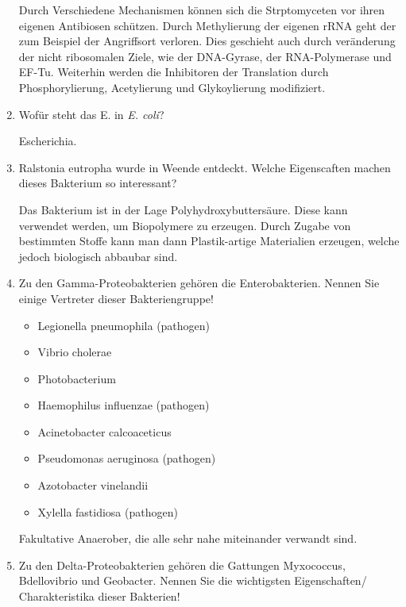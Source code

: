 \begin{enumerate}
		Durch Verschiedene Mechanismen können sich die Strptomyceten vor ihren eigenen Antibiosen schützen.
		Durch Methylierung der eigenen rRNA geht der zum Beispiel der Angriffsort verloren.
		Dies geschieht auch durch veränderung der nicht ribosomalen Ziele,
		wie der DNA-Gyrase, der RNA-Polymerase und EF-Tu. %
		Weiterhin werden die Inhibitoren der Translation durch Phosphorylierung,
		Acetylierung und Glykoylierung modifiziert.

	\item Wofür steht das E. in \emph{E. coli}? 

		Escherichia.

	\item Ralstonia eutropha wurde in Weende entdeckt. Welche Eigenscaften machen dieses Bakterium so interessant?
		
		Das Bakterium ist in der Lage Polyhydroxybuttersäure.
		Diese kann verwendet werden,
		um Biopolymere zu erzeugen.
		Durch Zugabe von bestimmten Stoffe kann man dann Plastik-artige Materialien erzeugen,
		welche jedoch biologisch abbaubar sind.

	\item Zu den Gamma-Proteobakterien gehören die Enterobakterien. Nennen Sie einige Vertreter dieser Bakteriengruppe!
	
		\begin{itemize}
			\item Legionella pneumophila	\hfill (pathogen)
			\item Vibrio cholerae
			\item Photobacterium
			\item Haemophilus influenzae 	\hfill (pathogen)
			\item Acinetobacter calcoaceticus
			\item	Pseudomonas aeruginosa 	\hfill (pathogen)
			\item Azotobacter vinelandii
			\item	Xylella fastidiosa 	\hfill (pathogen)

		\end{itemize}

		Fakultative Anaerober, die alle sehr nahe miteinander verwandt sind.

	\item Zu den Delta-Proteobakterien gehören die Gattungen Myxococcus, Bdellovibrio und Geobacter. Nennen Sie die wichtigsten Eigenschaften/ Charakteristika dieser Bakterien!
		

\end{enumerate}
